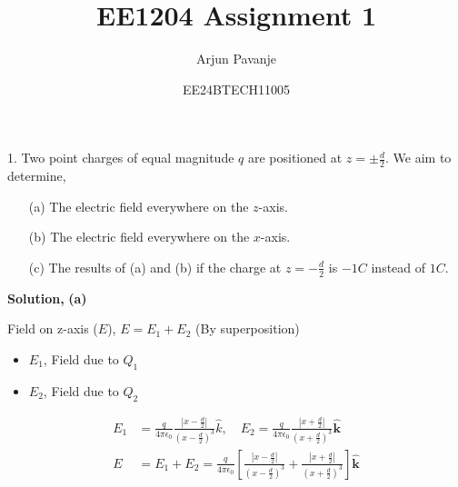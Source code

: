 \documentclass{article}
\title{EE1204 Assignment 1}
\author{Arjun Pavanje}
\date{EE24BTECH11005}
\begin{document}
\maketitle

1. Two point charges of equal magnitude $q$ are positioned at $z = \pm \frac{d}{2}$. We aim to determine,
\begin{enumerate}
    \item[(a)] The electric field everywhere on the $z$-axis.
    \item[(b)] The electric field everywhere on the $x$-axis.
    \item[(c)] The results of (a) and (b) if the charge at $z = -\frac{d}{2}$ is $-1C$ instead of $1C$.
\end{enumerate}

\textbf{Solution,}\newline
\textbf{(a)} 
\begin{figure}[!ht]
\centering
{}%

\label{fig,my_label}
\end{figure}
Field on z-axis ($E$), $E = E_1 + E_2$ (By superposition)

\begin{itemize}
    \item $E_1$, Field due to $Q_1$
    \item $E_2$, Field due to $Q_2$
\end{itemize}

\begin{align*}
E_1 &= \frac{q}{4 \pi \epsilon_0} \frac{|x-\frac{d}{2}| }{(x - \frac{d}{2})^3} \hat{k}, \quad
E_2 = \frac{q}{4 \pi \epsilon_0} \frac{|x + \frac{d}{2}|}{(x + \frac{d}{2})^3} \mathbf{\hat{k}} \\
E &= E_1 + E_2 = \frac{q}{4 \pi \epsilon_0} 
\left[ 
\frac{|x - \frac{d}{2}|}{(x - \frac{d}{2})^3} + \frac{|x + \frac{d}{2}|}{(x + \frac{d}{2})^3}
\right]\mathbf{\hat{k}}
\end{align*}
\end{document}
